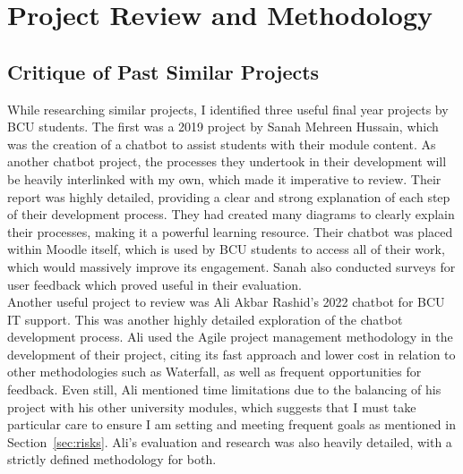 \documentclass[12pt]{report}
\begin{document}
    \chapter{Project Review and Methodology}
    \section{Critique of Past Similar Projects}
    While researching similar projects, I identified three useful final year projects by BCU students. The first
    was a 2019 project by Sanah Mehreen Hussain, which was the creation of a chatbot to assist students with their
    module content. As another chatbot project, the processes they undertook in their development will be heavily
    interlinked with my own, which made it imperative to review. Their report was highly detailed, providing 
    a clear and strong explanation of each step of their development process. They had created many diagrams
    to clearly explain their processes, making it a powerful learning resource. Their chatbot was placed 
    within Moodle itself, which is used by BCU students to access all of their work, which would massively improve
    its engagement. Sanah also conducted surveys for user feedback which proved useful in their evaluation.\\
    
    \noindent Another useful project to review was Ali Akbar Rashid's 2022 chatbot for BCU IT support. This was another 
    highly detailed exploration of the chatbot development process. Ali used the Agile project management 
    methodology in the development of their project, citing its fast approach and lower cost in relation
    to other methodologies such as Waterfall, as well as frequent opportunities for feedback. Even still,
    Ali mentioned time limitations due to the balancing of his project with his other university modules, which
    suggests that I must take particular care to ensure I am setting and meeting frequent goals as mentioned in 
    Section~\ref{sec:risks}. Ali's evaluation and research was also heavily detailed, with a strictly defined 
    methodology for both.\\
\end{document}
